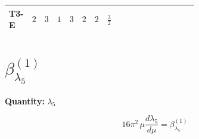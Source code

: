 \documentclass[8pt]{article}
\begin{document}
\begin{landscape}
\begin{longtable}{@{}llcccccc >{\raggedright\arraybackslash}p{0.21\linewidth} >{\raggedright\arraybackslash}p{0.21\linewidth} >{\raggedright\arraybackslash}p{0.21\linewidth}@{}}
\midrule
T3-E & $2$ & $3$ & $1$ & $3$ & $2$ & $2$ & $\frac{3}{2}$ & \scriptsize\adjustbox{max width=\linewidth}{$\begin{gathered} +\frac{32 {\lambda_{12}^{(\times)}}^2}{3}\end{gathered}$} & \scriptsize\adjustbox{max width=\linewidth}{$\begin{gathered} +\frac{8 {\lambda_{12}^{(\times)}} {\lambda_{S_1}^{(A)}}}{3}\end{gathered}$} & \scriptsize\adjustbox{max width=\linewidth}{$\begin{gathered} +\frac{8 {\lambda_{12}^{(\times)}} {\lambda_{S_2}^{(A)}}}{3}\end{gathered}$} \\
\midrule
\bottomrule
\end{longtable}
\clearpage
\section*{$\beta_{\lambda_5}^{(1)}$}
\noindent\textbf{Quantity: }$\lambda_5$\par\smallskip
\[16\pi^2\,\mu\frac{d \lambda_5}{d\mu}=\beta_{\lambda_5}^{(1)}\]

\end{landscape}
\end{document}
